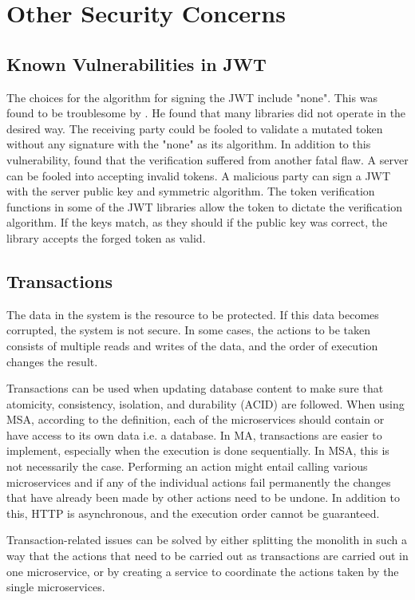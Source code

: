 \section{Other Security Concerns}
\subsection{Known Vulnerabilities in JWT}
\begin{sloppypar}
    The choices for the algorithm for signing the JWT include "none". This was
    found to be troublesome by \citet{nonejwt}. He found that many libraries did
    not operate in the desired way. The receiving party could be fooled to
    validate a mutated token without any signature with the "none" as its
    algorithm. In addition to this vulnerability, \citet{nonejwt} found that the
    verification suffered from another fatal flaw. A server can be fooled into 
    accepting invalid tokens. A malicious party can sign a JWT with the
    server public key and symmetric algorithm. The token verification
    functions in some of the JWT libraries allow the token to dictate the
    verification algorithm. If the keys match, as they should if the public key
    was correct, the library accepts the forged token as valid.
\end{sloppypar}

\subsection{Transactions}
\begin{sloppypar}
    The data in the system is the resource to be protected. If this data becomes
    corrupted, the system is not secure. In some cases, the actions to be taken
    consists of multiple reads and writes of the data, and the order of
    execution changes the result.
\end{sloppypar}
\begin{sloppypar}
    Transactions can be used when updating database content to make sure that
    atomicity, consistency, isolation, and durability (ACID) \citep{acid} are
    followed. When using MSA, according to the definition, each of the
    microservices should contain or have access to its own data i.e. a database.
    In MA, transactions are easier to implement, especially when the execution
    is done sequentially. In MSA, this is not necessarily the case. Performing
    an action might entail calling various microservices and if any of the
    individual actions fail permanently the changes that have already been made
    by other actions need to be undone. In addition to this, HTTP is
    asynchronous, and the execution order cannot be guaranteed.
\end{sloppypar}
\begin{sloppypar}
    Transaction-related issues can be solved by either splitting the monolith
    in such a way that the actions that need to be carried out as transactions
    are carried out in one microservice, or by creating a service to
    coordinate the actions taken by the single microservices.
\end{sloppypar}

